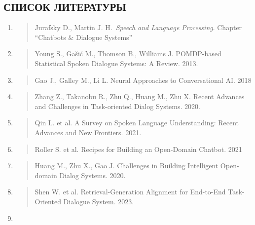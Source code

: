 \hypertarget{ux441ux43fux438ux441ux43eux43a-ux43bux438ux442ux435ux440ux430ux442ux443ux440ux44b}{%
\subsection{СПИСОК
ЛИТЕРАТУРЫ}\label{ux441ux43fux438ux441ux43eux43a-ux43bux438ux442ux435ux440ux430ux442ux443ux440ux44b}}

\begin{enumerate}
\def\labelenumi{\arabic{enumi}.}
\item
  \begin{quote}
  Jurafsky D., Martin J. H.~\emph{Speech and Language Processing}.
  Chapter ``Chatbots \& Dialogue Systems''
  \end{quote}
\item
  \begin{quote}
  Young S., Gašić M., Thomson B., Williams J. POMDP-based Statistical
  Spoken Dialogue Systems: A Review. 2013.
  \end{quote}
\item
  \begin{quote}
  Gao J., Galley M., Li L. Neural Approaches to Conversational AI. 2018
  \end{quote}
\item
  \begin{quote}
  Zhang Z., Takanobu R., Zhu Q., Huang M., Zhu X. Recent Advances and
  Challenges in Task-oriented Dialog Systems. 2020.
  \end{quote}
\item
  \begin{quote}
  Qin L. et al. A Survey on Spoken Language Understanding: Recent
  Advances and New Frontiers. 2021.
  \end{quote}
\item
  \begin{quote}
  Roller S. et al. Recipes for Building an Open-Domain Chatbot. 2021
  \end{quote}
\item
  \begin{quote}
  Huang M., Zhu X., Gao J. Challenges in Building Intelligent
  Open-domain Dialog Systems. 2020.
  \end{quote}
\item
  \begin{quote}
  Shen W. et al. Retrieval-Generation Alignment for End-to-End
  Task-Oriented Dialogue System. 2023.
  \end{quote}
\item
  \begin{quote}

\end{quote}
\end{enumerate}
